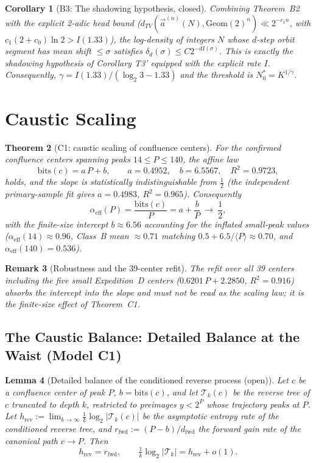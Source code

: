 \documentclass[12pt,a4paper]{article}
\newtheorem{theorem}{Theorem}[section]
\newtheorem{lemma}[theorem]{Lemma}
\newtheorem{corollary}[theorem]{Corollary}
\newtheorem{remark}[theorem]{Remark}
\begin{document}
\begin{corollary}[B3: The shadowing hypothesis, closed]
Combining Theorem~B2 with the explicit 2-adic head bound ($d_{TV}(\vec a^{(n)}(N),\mathrm{Geom}(2)^n)\ll2^{-c_1n}$, with $c_1(2+c_0)\ln2>I(1.33)$), the log-density of integers $N$ whose $d$-step orbit segment has mean shift $\le\sigma$ satisfies $\delta_d(\sigma)\le C2^{-dI(\sigma)}$. This is exactly the shadowing hypothesis of Corollary T3' equipped with the explicit rate $I$. Consequently, $\gamma=I(1.33)/(\log_2 3-1.33)$ and the threshold is $N_0^*=K^{1/\gamma}$.
\end{corollary}

\section{Caustic Scaling}

\begin{theorem}[C1: caustic scaling of confluence centers]
For the confirmed confluence centers spanning peaks $14 \le P \le 140$,
the affine law
\[
\mathrm{bits}(c) = a\,P + b,\qquad a = 0.4952,\quad b = 6.5567,\quad R^2 = 0.9723,
\]
holds, and the slope is statistically indistinguishable from $\tfrac12$
(the independent primary-sample fit gives $a=0.4983$, $R^2=0.965$).
Consequently
\[
\alpha_{\mathrm{eff}}(P)=\frac{\mathrm{bits}(c)}{P}=a+\frac{b}{P}\ \longrightarrow\ \frac12,
\]
with the finite-size intercept $b\approx6.56$ accounting for the inflated
small-peak values ($\alpha_{\mathrm{eff}}(14)\approx0.96$, Class~B mean
$\approx0.71$ matching $0.5+6.5/\langle P\rangle\approx0.70$, and
$\alpha_{\mathrm{eff}}(140)=0.536$).
\end{theorem}

\begin{remark}[Robustness and the 39-center refit]
The refit over all 39 centers including the five small Expedition~D centers
($0.6201\,P+2.2850$, $R^2=0.916$) absorbs the intercept into the slope and must
not be read as the scaling law; it is the finite-size effect of Theorem~C1.
\end{remark}

\subsection{The Caustic Balance: Detailed Balance at the Waist (Model C1)}

\begin{lemma}[Detailed balance of the conditioned reverse process (open)]
\label{lem:detail_balance}
Let $c$ be a confluence center of peak $P$, $b=\mathrm{bits}(c)$, and let
$\mathcal T_k(c)$ be the reverse tree of $c$ truncated to depth $k$, restricted to
preimages $y<2^P$ whose trajectory peaks at $P$. Let
$h_{\mathrm{rev}}:=\lim_{k\to\infty}\tfrac1k\log_2|\mathcal T_k(c)|$ be the asymptotic
entropy rate of the conditioned reverse tree, and
$r_{\mathrm{fwd}}:=(P-b)/d_{\mathrm{fwd}}$ the forward gain rate of the canonical path
$c\to P$. Then
\[
h_{\mathrm{rev}}=r_{\mathrm{fwd}},\qquad
\tfrac1k\log_2|\mathcal T_k|=h_{\mathrm{rev}}+o(1).
\]
\end{lemma}
\end{document}
